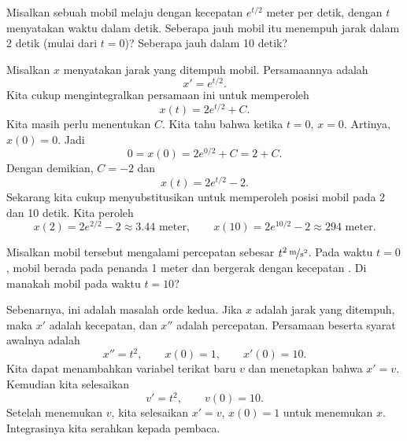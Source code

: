 \begin{example}
Misalkan sebuah mobil melaju dengan kecepatan $e^{t/2}$ meter per detik,
dengan $t$ menyatakan waktu dalam detik.
Seberapa jauh mobil itu menempuh jarak dalam 2 detik (mulai dari $t=0$)?  Seberapa jauh dalam 10 detik?

Misalkan $x$ menyatakan jarak yang ditempuh mobil.
Persamaannya adalah
\begin{equation*}
x' = e^{t/2} .
\end{equation*}
Kita cukup mengintegralkan persamaan ini untuk memperoleh
\begin{equation*}
x(t) = 2 e^{t/2} + C .
\end{equation*}
Kita masih perlu menentukan $C$.  Kita tahu bahwa ketika $t=0$,
$x=0$.  Artinya, $x(0) = 0$.  Jadi
\begin{equation*}
0 = x(0) = 2e^{0/2} + C = 2 + C .
\end{equation*}
Dengan demikian, $C = -2$ dan
\begin{equation*}
x(t) = 2 e^{t/2} - 2 .
\end{equation*}
Sekarang kita cukup menyubstitusikan untuk memperoleh posisi mobil pada 2 dan 10 detik.
Kita peroleh
\begin{equation*}
x(2) = 2e^{2/2} - 2 \approx 3.44 \text{ meter} ,
\qquad
x(10) = 2e^{10/2} - 2 \approx 294 \text{ meter} .
\end{equation*}
\end{example}

\begin{example}
Misalkan mobil tersebut mengalami percepatan sebesar $\unitfrac[t^2]{m}{s^2}$.
Pada waktu $t=0$, mobil berada pada penanda 1 meter dan bergerak dengan kecepatan
.  Di manakah mobil pada waktu $t=10$?

Sebenarnya, ini adalah masalah orde kedua.  Jika $x$ adalah jarak
yang ditempuh, maka $x'$ adalah kecepatan, dan $x''$ adalah percepatan.
Persamaan beserta syarat awalnya adalah
\begin{equation*}
x'' = t^2 , \qquad x(0) = 1 , \qquad x'(0) = 10 .
\end{equation*}
Kita dapat menambahkan variabel terikat baru $v$ dan menetapkan bahwa $x' = v$.  Kemudian kita selesaikan
\begin{equation*}
v' = t^2, \qquad v(0) = 10 .
\end{equation*}
Setelah menemukan $v$, kita selesaikan $x' = v$, $x(0)=1$ untuk menemukan $x$.
Integrasinya kita serahkan kepada pembaca.
\end{example}

